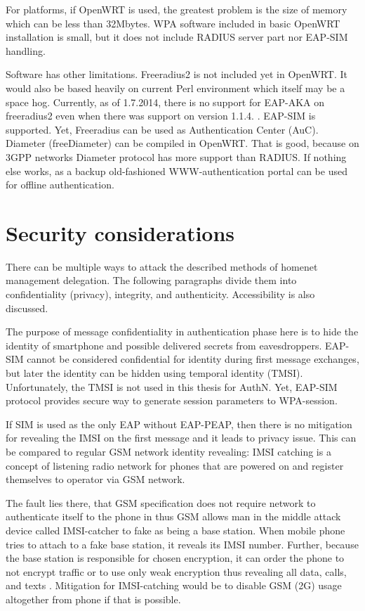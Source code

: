 \documentclass[12pt,a4paper,english]{tutthesis}
\begin{document}
For platforms, if OpenWRT is used, the greatest problem is the size of
memory which can be less than 32Mbytes.
WPA software included in basic OpenWRT installation is small,
but it does not include RADIUS server part nor EAP-SIM handling.


Software has other limitations. Freeradius2 is not included yet in OpenWRT.
It would also be based heavily on current Perl environment which
itself may be a space hog. 
Currently, as of 1.7.2014, there is no support for EAP-AKA on
freeradius2 even when there was support on version 1.1.4. \cite{freeradius2}.
EAP-SIM is supported.
Yet, Freeradius can be used as Authentication Center (AuC).
Diameter (freeDiameter) can be compiled in OpenWRT. That is good,
because on 3GPP networks Diameter protocol has more support than RADIUS.
If nothing else works, as a backup old-fashioned WWW-authentication
portal can be used for offline authentication.


\section{Security considerations}
\label{sec-6-5}



There can be multiple ways to attack the described methods of
homenet management delegation. The following paragraphs divide them into
confidentiality (privacy), integrity, and
authenticity. Accessibility is also discussed.


The purpose of message confidentiality in authentication phase here is
to hide the identity of smartphone and possible delivered secrets from
eavesdroppers. EAP-SIM cannot be considered confidential for identity
during first message exchanges, but later the identity can be hidden
using temporal identity (TMSI). Unfortunately, the TMSI is not used in
this thesis for AuthN. Yet, EAP-SIM protocol provides secure way to
generate session parameters to WPA-session.

If SIM is used as the only EAP without EAP-PEAP, then 
there is no mitigation for revealing the IMSI on the first message
and it leads to privacy issue.
This can be compared to regular GSM network identity revealing: IMSI
catching is a concept of listening radio network for phones that are
powered on and register themselves to operator via GSM network.  

The
fault lies there, that GSM specification does not require network to
authenticate itself to the phone in thus GSM allows man in the middle
attack device called IMSI-catcher to fake as being a base station.
When mobile phone tries to attach to a fake base station, it reveals its
IMSI number. Further, because the base station is responsible for chosen
encryption, it can order the phone to not encrypt traffic or to use only
weak encryption thus revealing all data, calls, and
texts \cite{imsi-heise}. Mitigation for IMSI-catching would be to
disable GSM (2G) usage altogether from phone if that is possible.
\end{document}
